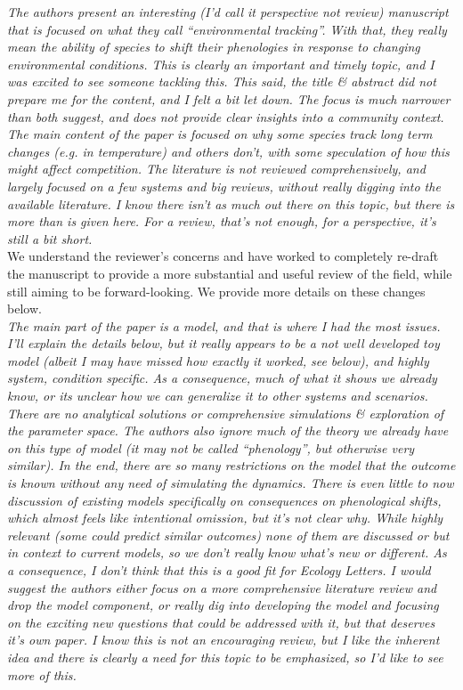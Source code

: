 \documentclass[11pt]{article}
\begin{document}
\emph{The authors present an interesting (I'd call it perspective not review) manuscript that is
focused on what they call ``environmental tracking''. With that, they really mean the ability
of species to shift their phenologies in response to changing environmental conditions. This
is clearly an important and timely topic, and I was excited to see someone tackling this.
This said, the title \& abstract did not prepare me for the content, and I felt a bit let
down. The focus is much narrower than both suggest, and does not provide clear insights into
a community context. The main content of the paper is focused on why some species track long
term changes (e.g. in temperature) and others don't, with some speculation of how this might
affect competition. The literature is not reviewed comprehensively, and largely focused on a
few systems and big reviews, without really digging into the available literature. I know
there isn't as much out there on this topic, but there is more than is given here. For a
review, that's not enough, for a perspective, it's still a bit short. }\\

We understand the reviewer's concerns and have worked to completely re-draft the manuscript to provide a more substantial and useful review of the field, while still aiming to be forward-looking. We provide more details on these changes below. \\

\emph{The main part of the
paper is a model, and that is where I had the most issues. I'll explain the details below,
but it really appears to be a not well developed toy model (albeit I may have missed how
exactly it worked, see below), and highly system, condition specific. As a consequence, much
of what it shows we already know, or its unclear how we can generalize it to other systems
and scenarios. There are no analytical solutions or comprehensive simulations \& exploration
of the parameter space. The authors also ignore much of the theory we already have on this
type of model (it may not be called ``phenology'', but otherwise very similar). In the end,
there are so many restrictions on the model that the outcome is known without any need of
simulating the dynamics. There is even little to now discussion of existing models
specifically on consequences on phenological shifts, which almost feels like intentional
omission, but it's not clear why. While highly relevant (some could predict similar outcomes)
none of them are discussed or but in context to current models, so we don't really know
what's new or different. As a consequence, I don't think that this is a good fit for Ecology
Letters. I would suggest the authors either focus on a more comprehensive literature review
and drop the model component, or really dig into developing the model and focusing on the
exciting new questions that could be addressed with it, but that deserves it's own paper. I
know this is not an encouraging review, but I like the inherent idea and there is clearly a
need for this topic to be emphasized, so I'd like to see more of this.}\\
\end{document}
